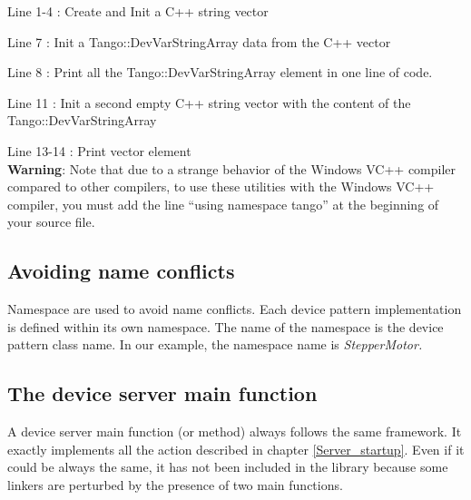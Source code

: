 Line 1-4 : Create and Init a C++ string vector

Line 7 : Init a Tango::DevVarStringArray data from the C++ vector

Line 8 : Print all the Tango::DevVarStringArray element in one line
of code.

Line 11 : Init a second empty C++ string vector with the content of
the Tango::DevVarStringArray

Line 13-14 : Print vector element\\

\textbf{Warning}: Note that due to a strange behavior of the Windows
VC++ compiler compared to other compilers, to use these utilities
with the Windows VC++ compiler, you must add the line ``using namespace
tango'' at the beginning of your source file.

\subsection{Avoiding name conflicts}

Namespace are used to avoid name conflicts. Each device pattern implementation
is defined within its own namespace. The name of
the namespace is the device pattern class name. In our example, the
namespace name is \emph{StepperMotor.}

\subsection{The device server main function}

A device server main function (or method) always follows
the same framework. It exactly implements all the action described
in chapter \ref{Server_startup}. Even if it could be always the same,
it has not been included in the library because some linkers are perturbed
by the presence of two main functions.



